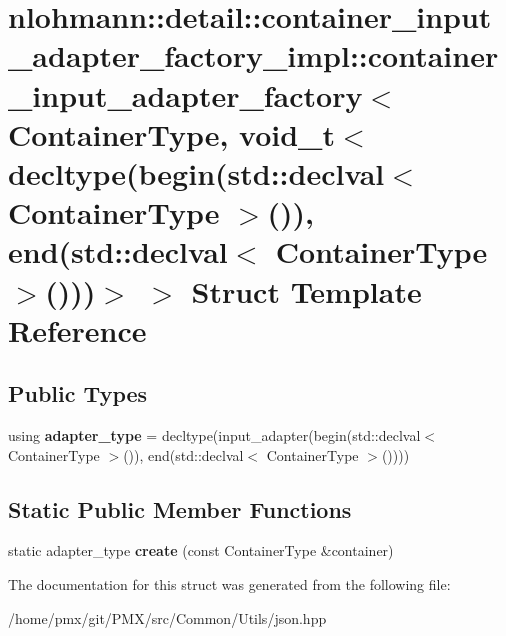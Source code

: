 \hypertarget{structnlohmann_1_1detail_1_1container__input__adapter__factory__impl_1_1container__input__adapte602516bdb0b70b8ee5c6d4ff825368be}{}\section{nlohmann\+:\+:detail\+:\+:container\+\_\+input\+\_\+adapter\+\_\+factory\+\_\+impl\+:\+:container\+\_\+input\+\_\+adapter\+\_\+factory$<$ Container\+Type, void\+\_\+t$<$ decltype(begin(std\+:\+:declval$<$ Container\+Type $>$()), end(std\+:\+:declval$<$ Container\+Type $>$()))$>$ $>$ Struct Template Reference}
\label{structnlohmann_1_1detail_1_1container__input__adapter__factory__impl_1_1container__input__adapte602516bdb0b70b8ee5c6d4ff825368be}
\subsection*{Public Types}
\begin{DoxyCompactItemize}
\item 
\mbox{\label{structnlohmann_1_1detail_1_1container__input__adapter__factory__impl_1_1container__input__adapte602516bdb0b70b8ee5c6d4ff825368be_aa801458464e2dc726530463d35310abf}} 
using {\bfseries adapter\+\_\+type} = decltype(input\+\_\+adapter(begin(std\+::declval$<$ Container\+Type $>$()), end(std\+::declval$<$ Container\+Type $>$())))
\end{DoxyCompactItemize}
\subsection*{Static Public Member Functions}
\begin{DoxyCompactItemize}
\item 
\mbox{\label{structnlohmann_1_1detail_1_1container__input__adapter__factory__impl_1_1container__input__adapte602516bdb0b70b8ee5c6d4ff825368be_a282eae71ce3b7a4249c6bc06da8b2670}} 
static adapter\+\_\+type {\bfseries create} (const Container\+Type \&container)
\end{DoxyCompactItemize}


The documentation for this struct was generated from the following file\+:\begin{DoxyCompactItemize}
\item 
/home/pmx/git/\+P\+M\+X/src/\+Common/\+Utils/json.\+hpp\end{DoxyCompactItemize}

